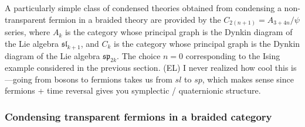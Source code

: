 \documentclass[12pt,a4paper]{article}
\newcommand{\dave}[1]{{\color{ao(english)}\footnotesize{(DA) #1}}}
\newcommand{\ethan}[1]{{\color{amethyst}\footnotesize{(EL) #1}}}
\newcommand{\kw}[1]{{\color{kwcolor}\footnotesize{(KW) #1}}}
\begin{document}
\medskip


A particularly simple class of condensed theories obtained from condensing a non-
transparent fermion in a braided theory are provided by the $C_{2(n+1)} = A_{3+4n} / \psi$ series, 
where $A_k$ is the category whose principal graph is the Dynkin diagram of the Lie algebra $\mathfrak{sl}_{k+1}$, 
and $C_k$ is the category whose principal graph is the Dynkin 
diagram of the Lie algebra $\mathfrak{sp}_{2k}$.
The choice $n=0$ 
corresponding to the Ising example considered in the previous section. 
\ethan{I never realized how cool this is---going from bosons to fermions takes us from $sl$ to $sp$, 
which makes sense since fermions + time reversal gives you symplectic / quaternionic structure. }


\subsubsection{Condensing transparent fermions in a braided category}
\label{condense_transparent_fermion}
\end{document}
